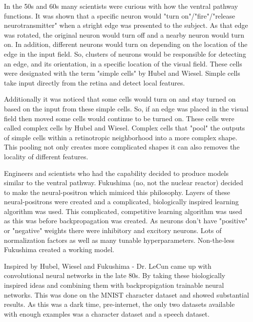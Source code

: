 \documentclass{article}
\begin{document}
\noindent In the 50s and 60s many scientists were curious with how the ventral pathway functions. 
It was shown that a specific neuron would "turn on"/"fire"/"release neurotransmitter" when a stright edge was presented to the subject.
As that edge was rotated, the original neuron would turn off and a nearby neuron would turn on.
In addition, different neurons would turn on depending on the location of the edge in the input field.
So, clusters of neurons would be responsible for detecting an edge, and its orientation, in a specific location of the visual field.
These cells were designated with the term "simple cells" by Hubel and Wiesel.
Simple cells take input directly from the retina and detect local features.

\vspace{3mm}

\noindent Additionally it was noticed that some cells would turn on and stay turned on based on the input from these simple cells.
So, if an edge was placed in the visual field then moved some cells would continue to be turned on.
These cells were called complex cells by Hubel and Wiesel.
Complex cells that "pool" the outputs of simple cells within a retinotropic neighborhood into a more complex shape.
This pooling not only creates more complicated shapes it can also removes the locality of different features.

\vspace{3mm}

\noindent Engineers and scientists who had the capability decided to produce models similar to the ventral pathway.
Fukushima (no, not the nuclear reactor) decided to make the neural-positron which mimiced this philosophy.
Layers of these neural-positrons were created and a complicated, biologically inspired learning algorithm was used.
This complicated, competitive learning algorithm was used as this was before backpropagation was created.
As neurons don't have "positive" or "negative" weights there were inhibitory and excitory neurons.
Lots of normalization factors as well as many tunable hyperparameters.
Non-the-less Fukushima created a working model.

\vspace{3mm}

\noindent Inspired by Hubel, Wiesel and Fukushima - Dr. LeCun came up with convolutional neural networks in the late 80s.
By taking these biologically inspired ideas and combining them with backpropigation trainable neural networks.
This was done on the MNIST character dataset and showed substantial results.
As this was a dark time, pre-internet, the only two datasets available with enough examples was a character dataset and a speech dataset.
\end{document}
